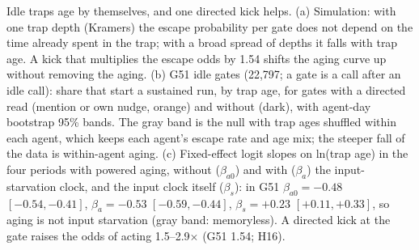 \caption{Idle traps age by themselves, and one directed kick helps.
(a) Simulation: with one trap depth (Kramers) the escape probability per gate does not depend on the time already spent in the trap; with a broad spread of depths it falls with trap age. A kick that multiplies the escape odds by 1.54 shifts the aging curve up without removing the aging.
(b) G51 idle gates (22{,}797; a gate is a call after an idle call): share that start a sustained run, by trap age, for gates with a directed read (mention or own nudge, orange) and without (dark), with agent-day bootstrap 95\% bands. The gray band is the null with trap ages shuffled within each agent, which keeps each agent's escape rate and age mix; the steeper fall of the data is within-agent aging.
(c) Fixed-effect logit slopes on ln(trap age) in the four periods with powered aging, without ($\beta_{a0}$) and with ($\beta_a$) the input-starvation clock, and the input clock itself ($\beta_s$): in G51 $\beta_{a0}=-0.48$ $[-0.54,-0.41]$, $\beta_a=-0.53$ $[-0.59,-0.44]$, $\beta_s=+0.23$ $[+0.11,+0.33]$, so aging is not input starvation (gray band: memoryless). A directed kick at the gate raises the odds of acting 1.5--2.9$\times$ (G51 1.54; H16).}
\label{fig:H16}
